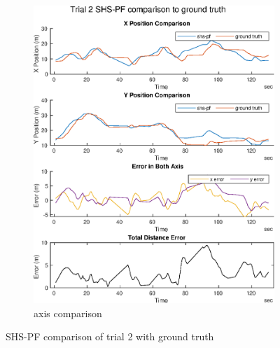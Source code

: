 \begin{figure}[H]
\begin{subfigure}[t]{.45\textwidth}
		\includegraphics[width=\linewidth]{images/20201107_1338_trial2_Total_Distance_Error}
		\caption{axis comparison}
		\label{fig:shspf_trial2_comparison}
	\end{subfigure}
	\caption{SHS-PF comparison of trial 2 with ground truth}
	\label{fig:shspf_trial2_shs_gt_comparison}
\end{figure}
